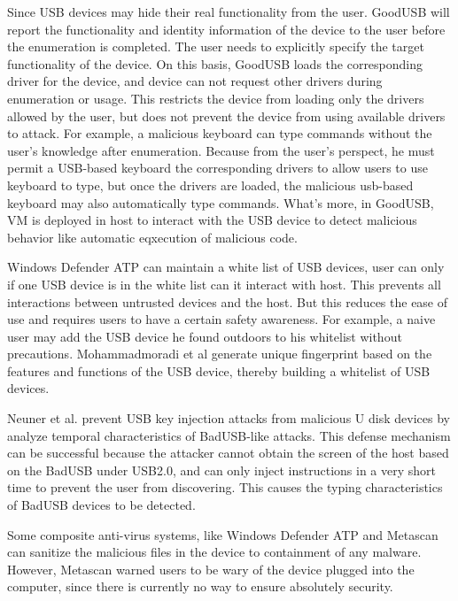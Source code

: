 Since USB devices may hide their real functionality from the user. GoodUSB\cite{tian2015defending} will report the functionality and identity information of the device to the user before the enumeration is completed. The user needs to explicitly specify the target functionality of the device. On this basis, GoodUSB loads the corresponding driver for the device, and device can not request other drivers during enumeration or usage. This restricts the device from loading only the drivers allowed by the user, but does not prevent the device from using available drivers to attack. For example, a malicious keyboard can type commands without the user's knowledge after enumeration. Because from the user's perspect, he must permit a USB-based keyboard the corresponding drivers to allow users to use keyboard to type, but once the drivers are loaded, the malicious usb-based keyboard may also automatically type commands. What's more, in GoodUSB, VM is deployed in host to interact with the USB device to detect malicious behavior like automatic eqxecution of malicious code.
 
Windows Defender ATP\cite{windenfenderwhite} can maintain a white list of USB devices, user can  only if one USB device is in the white list can it interact with host. This prevents all interactions between untrusted devices and the host. But this reduces the ease of use and requires users to have a certain safety awareness. For example, a naive user may add the USB device he found outdoors to his whitelist without precautions. Mohammadmoradi et al\cite{mohammadmoradi2018making} generate unique fingerprint based on the features and functions of the USB device, thereby building a whitelist of USB devices.

Neuner et al.\cite{neuner2018usblock} prevent USB key injection attacks from malicious U disk devices by analyze temporal characteristics of BadUSB-like attacks. This defense mechanism can be successful because the attacker cannot obtain the screen of the host based on the BadUSB under USB2.0, and can only inject instructions in a very short time to prevent the user from discovering. This causes the typing characteristics of BadUSB devices to be detected.

Some composite anti-virus systems, like Windows Defender ATP\cite{windenfender} and Metascan\cite{OPSWAT} can sanitize the malicious files in the device to containment of any malware. However, Metascan warned users to be wary of the device plugged into the computer, since there is currently no way to ensure absolutely security.


